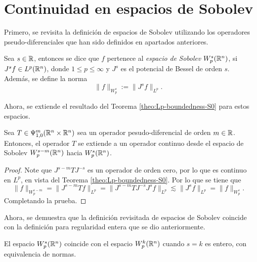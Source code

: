 \section{Continuidad en espacios de Sobolev}
Primero, se revisita la definición de espacios de Sobolev utilizando los operadores pseudo-diferenciales que han sido definidos en apartados anteriores.
\begin{definition}
	Sea $s\in\mathbb{R}$, entonces se dice que $f$ pertenece al \textit{espacio de Sobolev} $W^s_p(\mathbb{R}^n)$, si $J^sf\in L^p(\mathbb{R}^n)$, donde $1\leq p\leq\infty$ y $J^s$ es el potencial de Bessel de orden $s$. Además, se define la norma
	\begin{equation*}
		\|f\|_{W^s_p} := \|J^sf\|_{L^p}.
	\end{equation*} 
\end{definition}
Ahora, se extiende el resultado del Teorema \ref{theo:Lp-boundedness-S0} para estos espacios. 
\begin{theorem}\label{theo:Sobolev-S0}
	Sea $T\in\Psi^m_{1,0}(\mathbb{R}^n\times\mathbb{R}^n)$ sea un operador pesudo-diferencial de orden $m\in\mathbb{R}$. Entonces, el operador $T$ se extiende a un operador continuo desde el espacio de Sobolev $W^{s-m}_p(\mathbb{R}^n)$ hacia $W^s_p(\mathbb{R}^n)$. 
\end{theorem}
\begin{proof}
	Note que $J^{s-m}TJ^{-s}$ es un operador de orden cero, por lo que es continuo en $L^p$, en vista del Teorema \ref{theo:Lp-boundedness-S0}. Por lo que se tiene que 
	\begin{equation*}
		\|f\|_{W^{s-m}_p} = \|J^{s-m}Tf\|_{L^p} = \|J^{s-m}TJ^{-s}J^sf\|_{L^p} \lesssim \|J^sf\|_{L^p} = \|f\|_{W^s_p}.
	\end{equation*}
	Completando la prueba.
\end{proof}
Ahora, se demuestra que la definición revisitada de espacios de Sobolev coincide con la definición para regularidad entera que se dio anteriormente. 
\begin{theorem}
	El espacio $W^s_p(\mathbb{R}^n)$ coincide con el espacio $W^k_p(\mathbb{R}^n)$ cuando $s=k$ es entero, con equivalencia de normas.
\end{theorem}
